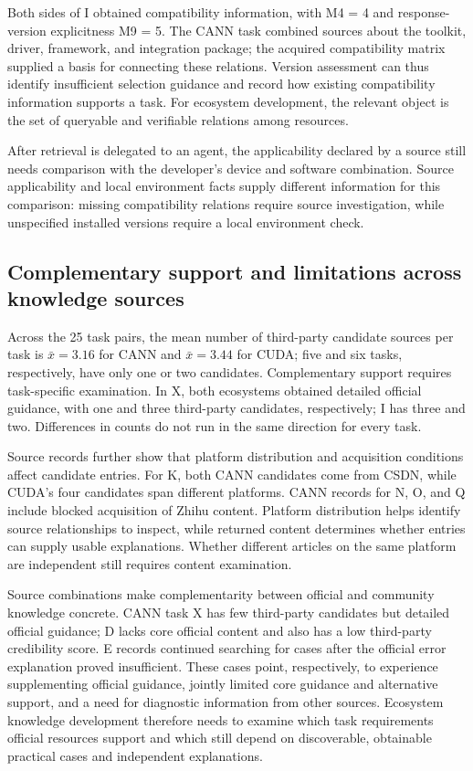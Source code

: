 \documentclass[manuscript,review,anonymous]{acmart}
\begin{document}
Both sides of I obtained compatibility information, with M4 = 4 and response-version explicitness M9 = 5. The CANN task combined sources about the toolkit, driver, framework, and integration package; the acquired compatibility matrix supplied a basis for connecting these relations. Version assessment can thus identify insufficient selection guidance and record how existing compatibility information supports a task. For ecosystem development, the relevant object is the set of queryable and verifiable relations among resources.

After retrieval is delegated to an agent, the applicability declared by a source still needs comparison with the developer's device and software combination. Source applicability and local environment facts supply different information for this comparison: missing compatibility relations require source investigation, while unspecified installed versions require a local environment check.

\subsection{Complementary support and limitations across knowledge sources}\label{complementary-support-and-limitations-across-knowledge-sources}

Across the 25 task pairs, the mean number of third-party candidate sources per task is \(\bar{x}=3.16\) for CANN and \(\bar{x}=3.44\) for CUDA; five and six tasks, respectively, have only one or two candidates. Complementary support requires task-specific examination. In X, both ecosystems obtained detailed official guidance, with one and three third-party candidates, respectively; I has three and two. Differences in counts do not run in the same direction for every task.

Source records further show that platform distribution and acquisition conditions affect candidate entries. For K, both CANN candidates come from CSDN, while CUDA's four candidates span different platforms. CANN records for N, O, and Q include blocked acquisition of Zhihu content. Platform distribution helps identify source relationships to inspect, while returned content determines whether entries can supply usable explanations. Whether different articles on the same platform are independent still requires content examination.

Source combinations make complementarity between official and community knowledge concrete. CANN task X has few third-party candidates but detailed official guidance; D lacks core official content and also has a low third-party credibility score. E records continued searching for cases after the official error explanation proved insufficient. These cases point, respectively, to experience supplementing official guidance, jointly limited core guidance and alternative support, and a need for diagnostic information from other sources. Ecosystem knowledge development therefore needs to examine which task requirements official resources support and which still depend on discoverable, obtainable practical cases and independent explanations.
\end{document}
